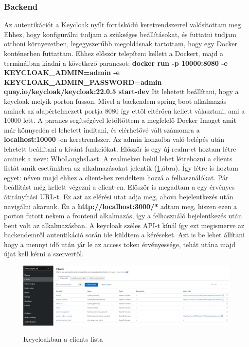\documentclass[a4paper,twoside]{article}
\begin{document}
\subsubsection{Backend}
Az autentikációt a Keycloak nyílt forráskódú keretrendszerrel valósítottam meg. Ehhez, hogy konfigurálni tudjam a 
szükséges beállításokat, és futtatni tudjam otthoni környezetben, legegyszerűbb megoldásnak tartottam, hogy egy Docker konténerben 
futtattam. Ehhez először telepíteni kellett a Dockert, majd a terminálban kiadni a következő parancsot: 
\textbf{docker run -p 10000:8080 -e KEYCLOAK\_ADMIN=admin -e KEYCLOAK\_ADMIN\_PASSWORD=admin quay.io/keycloak/keycloak:22.0.5 start-dev}
Itt lehetett beállítani, hogy a keycloak melyik porton fusson. Mivel a backendem spring boot alkalmazás aminek az alapértelmezett portja 8080 így 
ettől eltérően kellett választani, ami a 10000 lett. A parancs segítségével letöltöttem a megfelelő Docker Imaget amit már könnyedén el lehetett indítani,
és elérhetővé vált számomra a \textbf{localhost:10000} -en keretrendszer. Az admin konzolba való belépés után lehetett beállítani a kívánt funkciókat. 
Először is egy új realm-et hoztam létre aminek a neve: WhoLaughsLast. A realmeken belül lehet létrehozni a clients listát amik esetünkben az alkalmazásokat jelentik (\ref{keycloak}.ábra). Így létre is hoztam egyet:  néven majd ehhez a client-hez rendeltem hozzá a felhasználókat. 
Pár beállítást még kellett végezni a client-en. Először is megadtam a egy érvényes átirányítási URL-t. Ez azt az elérési utat adja meg, ahova bejelentkezés után navigálni akarunk. Én 
a \textbf{http://localhost:3000/*} adtam meg, hiszen ezen a porton futott nekem a frontend alkalmazás, így a felhasználó bejelentkezés után bent volt az alkalmazásban. A keycloak
széles API-t kínál így ezt megismerve az backendemről autentikáció során ide küldtem a kéréseket. Azt is be lehet állítani hogy a mennyi idő után jár le az access token érvényessége, tehát utána majd újat kell kérni a szervertől. 
\begin{figure}
	\caption{Keycloakban a clients lista}
	\centering
	\includegraphics[scale=0.5]{keycloak-cients}
	\label{keycloak}
\end{figure}
\FloatBarrier
\end{document}
